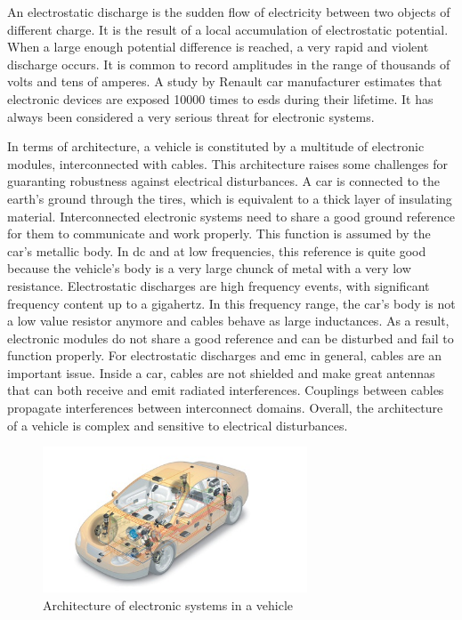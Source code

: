 An electrostatic discharge is the sudden flow of electricity between two objects of different charge.
It is the result of a local accumulation of electrostatic potential.
When a large enough potential difference is reached, a very rapid and violent discharge occurs.
It is common to record amplitudes in the range of thousands of volts and tens of amperes.
A study by Renault car manufacturer \cite{Renault-esd} estimates that electronic devices are exposed 10000 times to \gls{esd}s during their lifetime.
It has always been considered a very serious threat for electronic systems.

In terms of architecture, a vehicle is constituted by a multitude of electronic modules, interconnected with cables.
This architecture raises some challenges for guaranting robustness against electrical disturbances.
A car is connected to the earth's ground through the tires, which is equivalent to a thick layer of insulating material.
Interconnected electronic systems need to share a good ground reference for them to communicate and work properly.
This function is assumed by the car's metallic body.
In \gls{dc} and at low frequencies, this reference is quite good because the vehicle's body is a very large chunck of metal with a very low resistance.
Electrostatic discharges are high frequency events, with significant frequency content up to a gigahertz.
In this frequency range, the car's body is not a low value resistor anymore and cables behave as large inductances.
As a result, electronic modules do not share a good reference and can be disturbed and fail to function properly.
For electrostatic discharges and \gls{emc} in general, cables are an important issue.
Inside a car, cables are not shielded and make great antennas that can both receive and emit radiated interferences.
Couplings between cables propagate interferences between interconnect domains.
Overall, the architecture of a vehicle is complex and sensitive to electrical disturbances.

\begin{figure}[!h]
  \centering
  \includegraphics[width=0.7\textwidth]{src/1/figures/systemintegration_01_uv-data.jpg}
  \caption{Architecture of electronic systems in a vehicle \cite{car-architecture}}
  \label{fig:car-architecture}
\end{figure}

